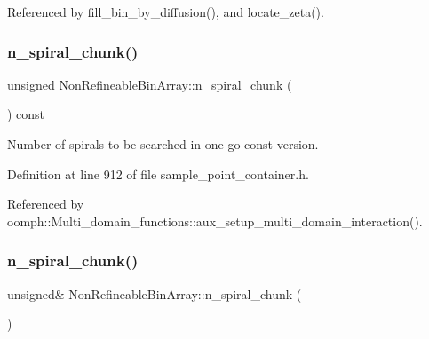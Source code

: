 Referenced by fill\+\_\+bin\+\_\+by\+\_\+diffusion(), and locate\+\_\+zeta().

\mbox{\label{classNonRefineableBinArray_a0ece8aca5700546a90d9a48cd932f3e6}} 
\subsubsection{\texorpdfstring{n\+\_\+spiral\+\_\+chunk()}{n\_spiral\_chunk()}\hspace{0.1cm}{\footnotesize\ttfamily [1/2]}}
{\footnotesize\ttfamily unsigned Non\+Refineable\+Bin\+Array\+::n\+\_\+spiral\+\_\+chunk (\begin{DoxyParamCaption}{ }\end{DoxyParamCaption}) const\hspace{0.3cm}{\ttfamily [inline]}}



Number of spirals to be searched in one go const version. 



Definition at line 912 of file sample\+\_\+point\+\_\+container.\+h.



Referenced by oomph\+::\+Multi\+\_\+domain\+\_\+functions\+::aux\+\_\+setup\+\_\+multi\+\_\+domain\+\_\+interaction().

\mbox{\label{classNonRefineableBinArray_ac5bd768e7644fc4d3a6af407e4c5e9ce}} 
\subsubsection{\texorpdfstring{n\+\_\+spiral\+\_\+chunk()}{n\_spiral\_chunk()}\hspace{0.1cm}{\footnotesize\ttfamily [2/2]}}
{\footnotesize\ttfamily unsigned\& Non\+Refineable\+Bin\+Array\+::n\+\_\+spiral\+\_\+chunk (\begin{DoxyParamCaption}{ }\end{DoxyParamCaption})\hspace{0.3cm}{\ttfamily [inline]}}



